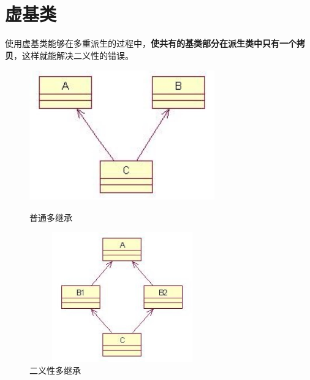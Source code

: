 \documentclass[UTF8,a4paper,12pt]{ctexbook} %
\begin{document}
	\section{虚基类}使用虚基类能够在多重派生的过程中，\textbf{使共有的基类部分在派生类中只有一个拷贝}，这样就能解决二义性的错误。
		        \begin{figure}[H]
		        	\begin{center}
		        		\begin{minipage}[H]{0.5\textwidth}
			        			\centering
			        			\includegraphics[angle=0,width=8cm,height=5.6cm]{derive.jpg}%
			        			\caption{普通多继承}
			        			\label{fig:derive}
		        		\end{minipage}%
		        		\begin{minipage}[H]{0.5\textwidth} 
			        			\centering
			        			\includegraphics[angle=0,width=8cm,height=5.6cm]{derive2.jpg}
			        			\caption{二义性多继承}
			        			\label{fig:derive2}
		        		\end{minipage}
		        	\end{center}
		        \end{figure}
        
\end{document}
